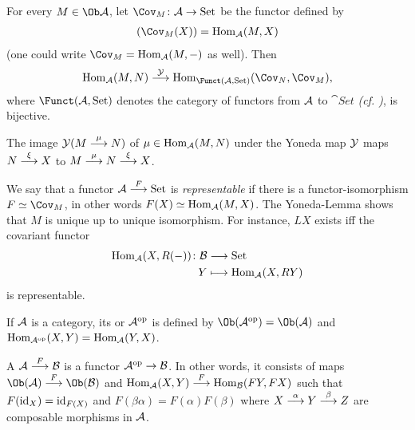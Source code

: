 \documentclass[a4paper,parskip=half,numbers=enddot, DIV=12]{scrreprt}
\begin{document}
	\begin{lem}
        For every $M\in\Ob \Aa$, let $\Cov_M\colon\Aa \morphism \cat{Set}$ be the functor defined by 
        \begin{align*}
            (\Cov_M(X)) = \Hom_\Aa(M,X)
        \end{align*}
        (one could write $\Cov_M=\Hom_\Aa(M,-)$ as well). Then 
        \begin{align*}
            \Hom_\Aa(M,N) \morphism[\Yy] \Hom_{\Funct(\Aa,\cat{Set})} (\Cov_N, \Cov_M),
        \end{align*}
        where $\Funct(\Aa,\cat{Set})$ denotes the category of functors from $\mathcal{A}$ to $\cat{Set}$ \emph{(cf. \cite[page~26]{alg1})}, is bijective. 
    \end{lem}
    \begin{rem*}
    	\begin{alphanumerate}
    		\item The image $\Yy(M\morphism[\mu]N)$ of $\mu\in\operatorname{Hom}_{\mathcal{A}}(M,N)$ under the Yoneda map $\mathcal{Y}$ maps $N\morphism[\xi]X$ to $M\morphism[\mu]N\morphism[\xi]X$.
    		\item  We say that a functor $\Aa\morphism[F] \cat{Set}$ is \emph{representable} if there is a functor-isomorphism $F\simeq \Cov_M$, in other words $F(X) \simeq \operatorname{Hom}_{\mathcal{A}}(M,X)$. The Yoneda-Lemma shows that $M$ is unique up to unique isomorphism. For instance, $LX$ exists iff the covariant functor 
    		\begin{align*}
    			\Hom_\Aa(X,R(-))\colon\Bb&\morphism\cat{Set}\\
    			Y &\longmapsto \Hom_\Aa(X, RY)
    		\end{align*}
    		is representable.
    	\end{alphanumerate}
    \end{rem*}
	\begin{defi}
		\begin{alphanumerate}
			\item If $\mathcal{A}$ is a category, its  or  $\mathcal{A}^{\mathrm{op}}$ is defined by  $\Ob(\Aa^\op) = \Ob(\Aa)$ and $\operatorname{Hom}_{\mathcal{A}^{\mathrm{op}}}(X,Y) = \operatorname{Hom}_{\mathcal{A}}(Y,X)$.
			\item A  $\Aa\morphism[F]\Bb$ is a functor $\Aa^\op\morphism \Bb$. In other words, it consists of maps $\Ob(\Aa)\morphism[F]\Ob(\Bb)$ and $\Hom_\Aa(X,Y) \morphism[F] \Hom_\Bb(FY, FX)$ such that $F(\operatorname{id}_X) = \operatorname{id}_{F(X)}$ and $F(\beta\alpha)  = F(\alpha)F(\beta)$ where $X\morphism[\alpha]Y\morphism[\beta] Z$ are composable morphisms in $\mathcal{A}$.
		\end{alphanumerate}
	\end{defi}
\end{document}
